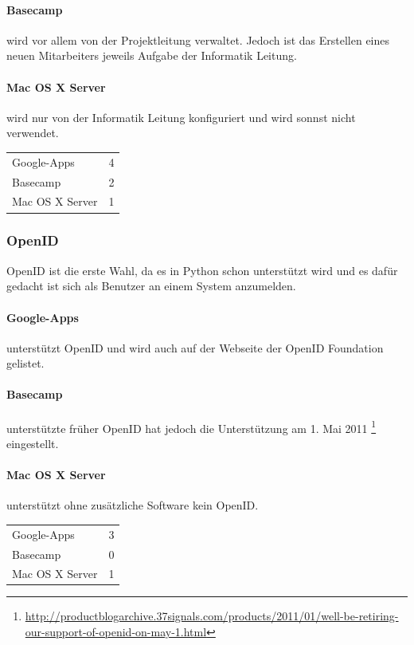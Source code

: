 \paragraph{Basecamp}
\label{par:1.3Basecamp}
wird vor allem von der Projektleitung verwaltet. Jedoch ist das Erstellen eines neuen Mitarbeiters jeweils Aufgabe der Informatik Leitung.
\paragraph{Mac OS X Server}
\label{par:1.3Mac OS X Server}
wird nur von der Informatik Leitung konfiguriert und wird sonnst nicht verwendet.

\begin{tabular}{lc}
Google-Apps & 4\\
Basecamp & 2\\
Mac OS X Server & 1\\
\end{tabular}

\subsubsection{OpenID}
\label{ssub:Bewertung OpenID}
OpenID ist die erste Wahl, da es in Python schon unterstützt wird und es dafür gedacht ist sich als Benutzer an einem System anzumelden.
\paragraph{Google-Apps}
\label{par:2.1Google-Apps}
unterstützt OpenID und wird auch auf der Webseite der OpenID Foundation gelistet.
\paragraph{Basecamp}
\label{par:2.1Basecamp}
unterstützte früher OpenID hat jedoch die Unterstützung am 1. Mai 2011 \footnote{\url{http://productblogarchive.37signals.com/products/2011/01/well-be-retiring-our-support-of-openid-on-may-1.html}} eingestellt.
\paragraph{Mac OS X Server}
\label{par:2.1Mac OS X Server}
unterstützt ohne zusätzliche Software kein OpenID.

\begin{tabular}{lc}
Google-Apps & 3\\
Basecamp & 0\\
Mac OS X Server & 1\\
\end{tabular}

